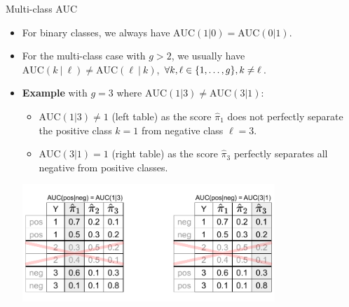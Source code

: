 \begin{vbframe}{Multi-class AUC}

\begin{itemize}
\item For binary classes, we always have $\text{AUC}(1 | 0) = \text{AUC}(0 | 1)$.

\item For the multi-class case with $g > 2$, we usually have
$\text{AUC}(k ~|~ \ell) \neq \text{AUC}(\ell ~|~ k)$, $\forall k, \ell \in \{1, \ldots, g\}, k \neq \ell$.

\item
\textbf{Example} with $g=3$ where $\text{AUC}(1|3) \neq \text{AUC}(3|1) $:
\begin{itemize}
\item $\text{AUC}(1|3) \neq 1$ (left table) as the score $\hat \pi_1$ does not perfectly separate the positive class $k=1$ from negative class $\ell=3$.
\item $\text{AUC}(3|1) = 1$ (right table) as the score $\hat \pi_3$ perfectly separates all negative from positive classes.
\end{itemize}

\centerline{\includegraphics[trim = 0 15 00 10, clip, width=0.75\textwidth]{figure_man/multiclass-auc.pdf}}

\end{itemize}


\end{vbframe}


